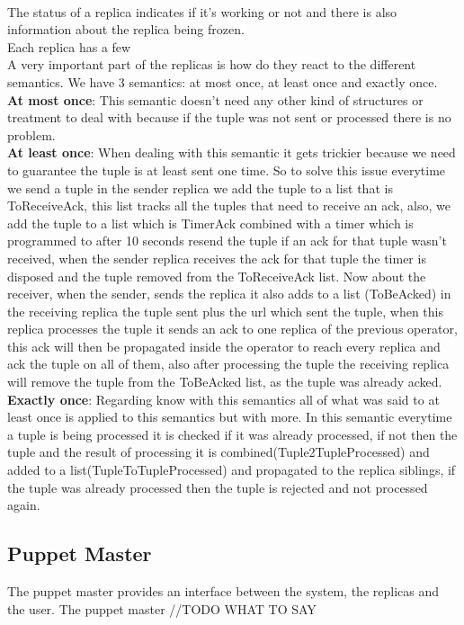 \documentclass[times, 10pt, twocolumn]{article}
\begin{document}
\\The status of a replica indicates if it's working or not and there is also information about the replica being frozen.
\\Each replica has a few
\\A very important part of the replicas is how do they react to the different semantics. We have 3 semantics: at most once, at least once and exactly once.
\\\textbf{At most once}: This semantic doesn't need any other kind of structures or treatment to deal with because if the tuple was not sent or processed there is no problem.
\\\textbf{At least once}: When dealing with this semantic it gets trickier because we need to guarantee the tuple is at least sent one time. So to solve this issue everytime we send a tuple in the sender replica we add the tuple to a list that is ToReceiveAck, this list tracks all the tuples that need to receive an ack, also, we add the tuple to a list which is TimerAck combined with a timer which is programmed to after 10 seconds resend the tuple if an ack for that tuple wasn't received, when the sender replica receives the ack for that tuple the timer is disposed and the tuple removed from the ToReceiveAck list. Now about the receiver, when the sender, sends the replica it also adds to a list (ToBeAcked) in the receiving replica the tuple sent plus the url which sent the tuple, when this replica processes the tuple it sends an ack to one replica of the previous operator, this ack will then be propagated inside the operator to reach every replica and ack the tuple on all of them, also after processing the tuple the receiving replica will remove the tuple from the ToBeAcked list, as the tuple was already acked.
\\\textbf{Exactly once}: Regarding know with this semantics all of what was said to at least once is applied to this semantics but with more. In this semantic everytime a tuple is being processed it is checked if it was already processed, if not then the tuple and the result of processing it is combined(Tuple2TupleProcessed) and added to a list(TupleToTupleProcessed) and propagated to the replica siblings, if the tuple was already processed then the tuple is rejected and not processed again.





\subsection{Puppet Master}
The puppet master provides an interface between the system, the replicas and the user.
The puppet master 
//TODO WHAT TO SAY
\end{document}
